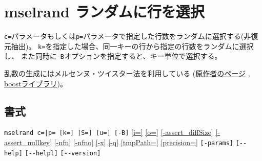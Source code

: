 
%

\section{mselrand ランダムに行を選択\label{sect:mselrand}}
\verb|c=|パラメータもしくは\verb|p=|パラメータで指定した行数をランダムに選択する(非復元抽出)。
\verb|k=|を指定した場合、同一キーの行から指定の行数をランダムに選択し、
また同時に\verb|-B|オプションを指定すると、キー単位で選択する。

乱数の生成にはメルセンヌ・ツイスター法を利用している
(\href{http://www.math.sci.hiroshima-u.ac.jp/~m-mat/MT/emt.html}{原作者のページ}
, \href{http://www.boost.org/doc/libs/1_54_0/doc/html/boost_random.html}{boostライブラリ})。


\subsection*{書式}
\verb/mselrand c=|p= [k=] [S=] [u=] [-B]/
\hyperref[sect:option_i]{[i=]}
\hyperref[sect:option_o]{[o=]}
\hyperref[sect:option_assert_diffSize]{[-assert\_diffSize]}
\hyperref[sect:option_assert_nullkey]{[-assert\_nullkey]}
\hyperref[sect:option_nfn]{[-nfn]} 
\hyperref[sect:option_nfno]{[-nfno]}  
\hyperref[sect:option_x]{[-x]}
\hyperref[sect:option_q]{[-q]}
\hyperref[sect:option_option_tmppath]{[tmpPath=]}
\hyperref[sect:option_precision]{[precision=]}
\verb|[-params]|
\verb|[--help]|
\verb|[--helpl]|
\verb|[--version]|\\

